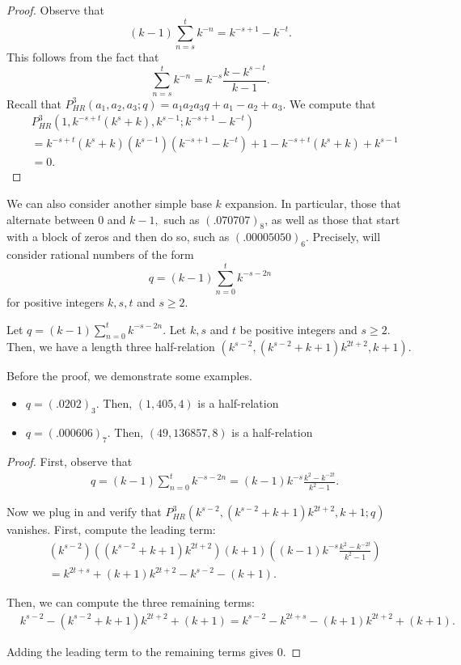 \documentclass[11 pt]{amsart}
\begin{document}
\begin{proof}

    Observe that \[(k-1)\sum_{n= s}^t k^{-n} = k^{-s + 1} - k^{-t}.\] This follows from the fact that \[\sum_{n = s}^t k^{-n} = k^{-s}\frac{k - k^{s-t}}{k-1}.\] Recall that $P_{HR}^3(a_1, a_2, a_3; q) = a_1a_2a_3q + a_1 - a_2 + a_3$. We compute that 
    \begin{align*}
        &P_{HR}^3(1, k^{-s + t}(k^s + k), k^{s - 1}; k^{-s + 1} - k^{-t}) \\
        & = k^{-s + t}(k^s + k)(k^{s-1})(k^{-s + 1} - k^{-t}) + 1 - k^{-s + t}(k^s + k) + k^{s - 1} \\
        & =0. 
    \end{align*}
    \end{proof}
We can also consider another simple base $k$ expansion. In particular, those that alternate between $0$ and $k-1,$ such as $(.070707)_{8}$, as well as those that start with a block of zeros and then do so, such as $(.00005050)_6$. Precisely, will consider rational numbers of the form \[q = (k-1)\sum_{n = 0}^t k^{-s - 2n}\] for positive integers $k, s, t$ and $s\ge 2$.

    \begin{proposition}
        Let $q = (k-1)\sum_{n = 0}^t k^{-s - 2n}$. Let $k, s$ and $t$ be positive integers and $s \ge 2$. Then, we have a length three half-relation $(k^{s-2}, (k^{s-2} + k+1)k^{2t + 2}, k + 1)$.
    \end{proposition}
  
    \begin{example} Before the proof, we demonstrate some examples.
        \begin{itemize}
            \item $q = (.0202)_3$. Then, $ (1, 405, 4)$ is a half-relation
            \item $q = (.000606)_7$. Then, $(49, 136857, 8)$ is a half-relation
        \end{itemize}
    \end{example}

\begin{proof}
First, observe that
\begin{align*}
    &q = (k-1)\sum_{n = 0}^t k^{-s - 2n} = (k-1)k^{-s}\frac{k^2 - k^{-2t}}{k^2 - 1}.
\end{align*}

Now we plug in and verify that $P_{HR}^3(k^{s-2}, (k^{s-2} + k+1)k^{2t + 2}, k + 1; q)$ vanishes. First, compute the leading term:
\begin{align*}
    &(k^{s-2}) ((k^{s-2} + k+1)k^{2t + 2})(k + 1)\left((k-1)k^{-s}\frac{k^2 - k^{-2t}}{k^2 - 1}\right) \\
    &= k^{2t+s} + (k+1)k^{2t + 2} - k^{s-2} - (k+1).
\end{align*}

Then, we can compute the three remaining terms:
\begin{align*}
    & k^{s-2} - (k^{s-2} + k+1)k^{2t + 2} + (k + 1) = k^{s-2} - k^{2t + s} - (k+1)k^{2t + 2} + (k + 1).
\end{align*}

Adding the leading term to the remaining terms gives $0$.
\end{proof}
\end{document}
